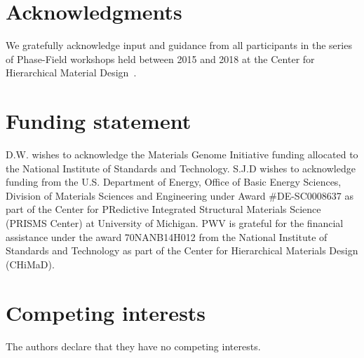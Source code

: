 \documentclass{jors}
\begin{document}
\section*{Acknowledgments}

We gratefully acknowledge input and guidance from all participants in
the series of Phase-Field workshops held between 2015 and 2018 at the
Center for Hierarchical Material Design~\cite{workshops}.

\section*{Funding statement}

D.W. wishes to acknowledge the Materials Genome Initiative funding
allocated to the National Institute of Standards and Technology. S.J.D
wishes to acknowledge funding from the U.S. Department of Energy,
Office of Basic Energy Sciences, Division of Materials Sciences and
Engineering under Award \#DE-SC0008637 as part of the Center for
PRedictive Integrated Structural Materials Science (PRISMS Center) at
University of Michigan. PWV is grateful for the financial assistance
under the award 70NANB14H012 from the National Institute of Standards
and Technology as part of the Center for Hierarchical Materials Design
(CHiMaD).

\section*{Competing interests}

The authors declare that they have no competing interests.

\printbibliography
\end{document}
